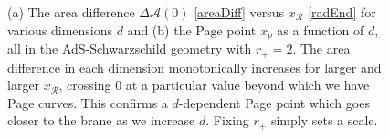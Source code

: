 \begin{figure}
\centering
{}
\quad
{}
\caption{(a) The area difference $\Delta\mathcal{A}(0)$ \eqref{areaDiff} versus $x_\mathcal{R}$ \eqref{radEnd} for various dimensions $d$ and (b) the Page point $x_p$ as a function of $d$, all in the AdS-Schwarzschild geometry with $r_+ = 2$. The area difference in each dimension monotonically increases for larger and larger $x_\mathcal{R}$, crossing $0$ at a particular value beyond which we have Page curves. This confirms a $d$-dependent Page point which goes closer to the brane as we increase $d$. Fixing $r_+$ simply sets a scale.}
\label{figs:pagePointAS}
\end{figure}